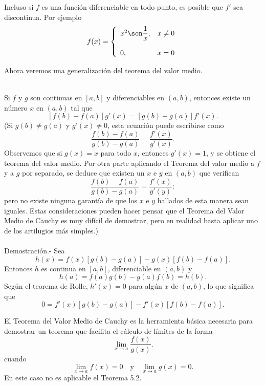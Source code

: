 Incluso si $f$ es una función diferenciable en todo punto, es posible que $f'$ sea discontinua. Por ejemplo
$$f(x)=\left\{\begin{array}{ll}
    x^2\sen\dfrac{1}{x},&x\neq 0\\\\
    0,&x=0\\
\end{array}\right.$$

Ahora veremos una generalización del teorema del valor medio.\\\\

\begin{teo}
    Si $f$ y $g$ son continuas en $[a,b]$ y diferenciables en $(a,b)$, entonces existe un número $x$ en $(a,b)$ tal que 
    $$[f(b)-f(a)]g'(x)=[g(b)-g(a)]f'(x).$$
    (Si $g(b)\neq g(a)$ y $g'(x)\neq 0$, esta ecuación puede escribirse como
    $$\dfrac{f(b)-f(a)}{g(b)-g(a)}=\dfrac{f'(x)}{g'(x)}.$$
    Observemos que si $g(x)=x$ para todo $x$, entonces $g'(x)=1$, y se obtiene el teorema del valor medio. Por otra parte aplicando el Teorema del valor medio a $f$ y a $g$ por separado, se deduce que existen un $x$ e $y$ en $(a,b)$ que verifican
    $$\dfrac{f(b)-f(a)}{g(b)-g(a)}=\dfrac{f'(x)}{g'(y)};$$
    pero no existe ninguna garantía de que los $x$ e $y$ hallados de esta manera sean iguales.
    Estas consideraciones pueden hacer pensar que el Teorema del Valor Medio de Cauchy es muy difícil de demostrar, pero en realidad basta aplicar uno de los artilugios más simples.)\\\\
	Demostración.-\; Sea 
	$$h(x)=f(x)\left[g(b)-g(a)\right]-g(x)\left[f(b)-f(a)\right].$$
	Entonces $h$ es continua en $[a,b]$, diferenciable en $(a,b)$ y 
	$$h(a)=f(a)g(b)-g(a)f(b)=h(b).$$
	Según el teorema de Rolle, $h'(x)=0$ para algún $x$ de $(a,b)$, lo que significa que 
	$$0=f'(x)\left[g(b)-g(a)\right]-f'(x)\left[f(b)-f(a)\right].$$
\end{teo}

El Teorema del Valor Medio de Cauchy es la herramienta básica necesaria para demostrar un teorema que facilita el cálculo de límites de la forma
$$\lim_{x\to a}\dfrac{f(x)}{g(x)}.$$
cuando
$$\lim_{x\to a}f(x)=0\quad \mbox{y}\quad \lim_{x\to a}g(x)=0.$$
En este caso no es aplicable el Teorema 5.2.\\\\

